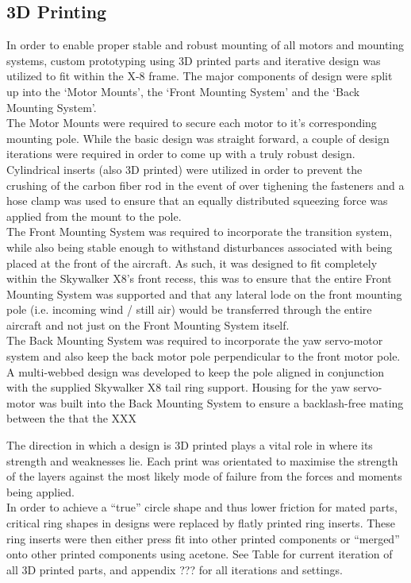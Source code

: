 \subsection{3D Printing}
In order to enable proper stable and robust mounting of all motors and mounting systems, custom prototyping using 3D printed parts and iterative design was utilized to fit within the X-8 frame. The major components of design were split up into the `Motor Mounts', the `Front  Mounting System' and the `Back Mounting System'.\\

The Motor Mounts were required to secure each motor to it's corresponding mounting pole. While the basic design was straight forward, a couple of design iterations were required in order to come up with a truly robust design. Cylindrical inserts (also 3D printed) were utilized in order to prevent the crushing of the carbon fiber rod in the event of over tighening the fasteners and a hose clamp was used to ensure that an equally distributed squeezing force was applied from the mount to the pole.\\

The Front Mounting System was required to incorporate the transition system, while also being stable enough to withstand disturbances associated with being placed at the front of the aircraft. As such, it was designed to fit completely within the Skywalker X8's front recess, this was to ensure that the entire Front Mounting System was supported and that any lateral lode on the front mounting pole (i.e. incoming wind / still air) would be transferred through the entire aircraft and not just on the Front Mounting System itself.\\

The Back Mounting System was required to incorporate the yaw servo-motor system and also keep the back motor pole perpendicular to the front motor pole. A multi-webbed design was developed to keep the pole aligned in conjunction with the supplied Skywalker X8 tail ring support. Housing for the yaw servo-motor was built into the Back Mounting System to ensure a backlash-free mating between the that the XXX

The direction in which a design is 3D printed plays a vital role in where its strength and weaknesses lie. Each print was orientated to maximise the strength of the layers against the most likely mode of failure from the forces and moments being applied.\\
In order to achieve a ``true'' circle shape and thus lower friction for mated parts, critical ring shapes in designs were replaced by flatly printed ring inserts. These ring inserts were then either press fit into other printed components or ``merged'' onto other printed components using acetone. See Table \red{[REF]} for current iteration of all 3D printed parts, and appendix ??? for all iterations and settings. 

